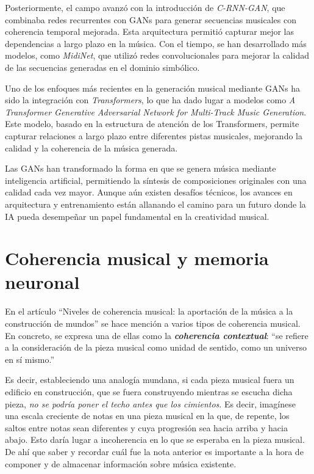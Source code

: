Posteriormente, el campo avanzó con la introducción de \emph{C-RNN-GAN}, que combinaba redes recurrentes con GANs para generar secuencias musicales con coherencia temporal mejorada. Esta arquitectura permitió capturar mejor las dependencias a largo plazo en la música. Con el tiempo, se han desarrollado más modelos, como \emph{MidiNet}, que utilizó redes convolucionales para mejorar la calidad de las secuencias generadas en el dominio simbólico.

Uno de los enfoques más recientes en la generación musical mediante GANs ha sido la integración con \emph{Transformers}, lo que ha dado lugar a modelos como \emph{A Transformer Generative Adversarial Network for Multi-Track Music Generation}. Este modelo, basado en la estructura de atención de los Transformers, permite capturar relaciones a largo plazo entre diferentes pistas musicales, mejorando la calidad y la coherencia de la música generada.

Las GANs han transformado la forma en que se genera música mediante inteligencia artificial, permitiendo la síntesis de composiciones originales con una calidad cada vez mayor. Aunque aún existen desafíos técnicos, los avances en arquitectura y entrenamiento están allanando el camino para un futuro donde la IA pueda desempeñar un papel fundamental en la creatividad musical.

\section{Coherencia musical y memoria neuronal}

En el artículo ``Niveles de coherencia musical: la aportación de la música a la construcción de mundos''\citep{sibetrans2025coherencia} se hace mención a varios tipos de coherencia musical. En concreto, se expresa una de ellas como la \emph{\textbf{coherencia contextual}}: ``se refiere a la consideración de la pieza musical como unidad de sentido, como un universo en sí mismo.''

Es decir, estableciendo una analogía mundana, si cada pieza musical fuera un edificio en construcción, que se fuera construyendo mientras se escucha dicha pieza, \emph{no se podría poner el techo antes que los cimientos}. Es decir, imagínese una escala creciente de notas en una pieza musical en la que, de repente, los saltos entre notas sean diferentes y cuya progresión sea hacia arriba y hacia abajo. Esto daría lugar a incoherencia en lo que se esperaba en la pieza musical. De ahí que saber y recordar cuál fue la nota anterior es importante a la hora de componer y de almacenar información sobre música existente.

